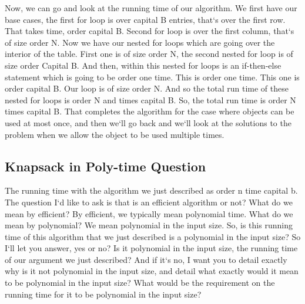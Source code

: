 Now, we can go and look at the running time of our algorithm.
We first have our base cases, the first for loop is over capital B entries, that`s over the first row.
That takes time, order capital B\@.
Second for loop is over the first column, that`s of size order N\@.
Now we have our nested for loops which are going over the interior of the table.
First one is of size order N, the second nested for loop is of size order Capital B\@.
And then, within this nested for loops is an if-then-else statement which is going to be order one time.
This is order one time.
This one is order capital B\@.
Our loop is of size order N\@.
And so the total run time of these nested for loops is order N and times capital B\@.
So, the total run time is order N times capital B\@.
That completes the algorithm for the case where objects can be used at most once, and then we`ll go back and we`ll look at the solutions to the problem when we allow the object to be used multiple times.

\subsection{Knapsack in Poly-time Question}
The running time with the algorithm we just described as order n time capital b.
The question I`d like to ask is that is an efficient algorithm or not? What do we mean by efficient? By efficient, we typically mean polynomial time.
What do we mean by polynomial? We mean polynomial in the input size.
So, is this running time of this algorithm that we just described is a polynomial in the input size? So I`ll let you answer, yes or no? Is it polynomial in the input size, the running time of our argument we just described? And if it`s no, I want you to detail exactly why is it not polynomial in the input size, and detail what exactly would it mean to be polynomial in the input size? What would be the requirement on the running time for it to be polynomial in the input size?

